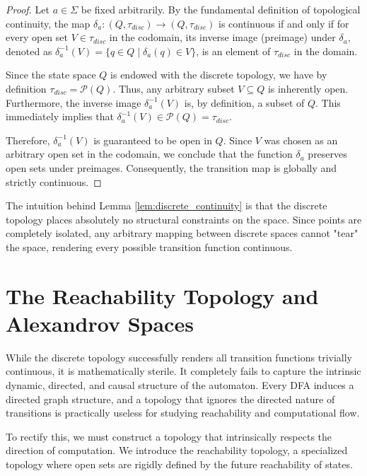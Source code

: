 \begin{proof}
Let $a \in \Sigma$ be fixed arbitrarily. By the fundamental definition of topological continuity, the map $\delta_a: (Q, \tau_{disc}) \to (Q, \tau_{disc})$ is continuous if and only if for every open set $V \in \tau_{disc}$ in the codomain, its inverse image (preimage) under $\delta_a$, denoted as $\delta_a^{-1}(V) = \{ q \in Q \mid \delta_a(q) \in V \}$, is an element of $\tau_{disc}$ in the domain.

Since the state space $Q$ is endowed with the discrete topology, we have by definition $\tau_{disc} = \mathcal{P}(Q)$. Thus, any arbitrary subset $V \subseteq Q$ is inherently open. Furthermore, the inverse image $\delta_a^{-1}(V)$ is, by definition, a subset of $Q$. This immediately implies that $\delta_a^{-1}(V) \in \mathcal{P}(Q) = \tau_{disc}$. 

Therefore, $\delta_a^{-1}(V)$ is guaranteed to be open in $Q$. Since $V$ was chosen as an arbitrary open set in the codomain, we conclude that the function $\delta_a$ preserves open sets under preimages. Consequently, the transition map is globally and strictly continuous.
\end{proof}

The intuition behind Lemma \ref{lem:discrete_continuity} is that the discrete topology places absolutely no structural constraints on the space. Since points are completely isolated, any arbitrary mapping between discrete spaces cannot "tear" the space, rendering every possible transition function continuous.

\section{The Reachability Topology and Alexandrov Spaces}

While the discrete topology successfully renders all transition functions trivially continuous, it is mathematically sterile. It completely fails to capture the intrinsic dynamic, directed, and causal structure of the automaton. Every DFA induces a directed graph structure, and a topology that ignores the directed nature of transitions is practically useless for studying reachability and computational flow. 

To rectify this, we must construct a topology that intrinsically respects the direction of computation. We introduce the reachability topology, a specialized topology where open sets are rigidly defined by the future reachability of states. 

